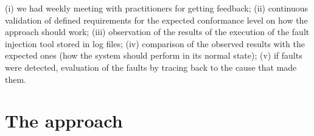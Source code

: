 \begin{itemize}
(i) we had weekly meeting with practitioners for getting feedback;
(ii) continuous validation of  defined requirements for the expected conformance level on how the approach should work; 
(iii) observation of the results of the execution of the fault injection tool stored in log files;
(iv) comparison of the observed results with the expected ones (how the system should perform in its normal state);
(v) if faults were detected, evaluation of the faults by tracing back to the cause that made them.
\end{itemize}

\section{The \approach{} approach}\label{sec:approach}



